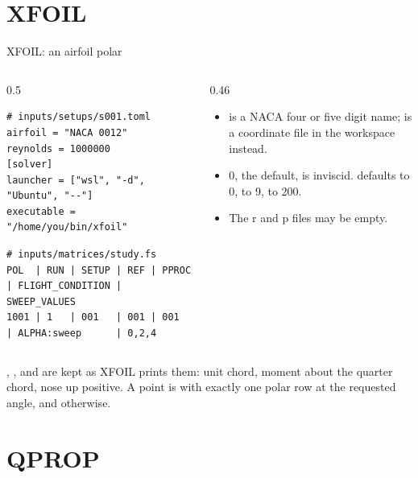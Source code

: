 %
%

\section{XFOIL}

\begin{frame}[fragile]{XFOIL: an airfoil polar}
\begin{columns}[T]
\begin{column}{0.5\textwidth}
\begin{lstlisting}[style=cfdbtoml]
# inputs/setups/s001.toml
airfoil = "NACA 0012"
reynolds = 1000000
[solver]
launcher = ["wsl", "-d", "Ubuntu", "--"]
executable = "/home/you/bin/xfoil"
\end{lstlisting}
\begin{lstlisting}
# inputs/matrices/study.fs
POL  | RUN | SETUP | REF | PPROC | FLIGHT_CONDITION | SWEEP_VALUES
1001 | 1   | 001   | 001 | 001   | ALPHA:sweep      | 0,2,4
\end{lstlisting}
\end{column}
\begin{column}{0.46\textwidth}
\begin{itemize}\small
  \item {} is a NACA four or five digit name;
         is a coordinate file in the workspace instead.
  \item {} 0, the default, is inviscid.  defaults
        to 0,  to 9,  to 200.
  \item The r and p files may be empty.
\end{itemize}
\end{column}
\end{columns}
\begin{cfdbevidence}
, ,  and  are kept as XFOIL prints them:
unit chord, moment about the quarter chord, nose up positive. A point is
 with exactly one polar row at the requested angle, and
 otherwise.
\end{cfdbevidence}
\end{frame}

\section{QPROP}


